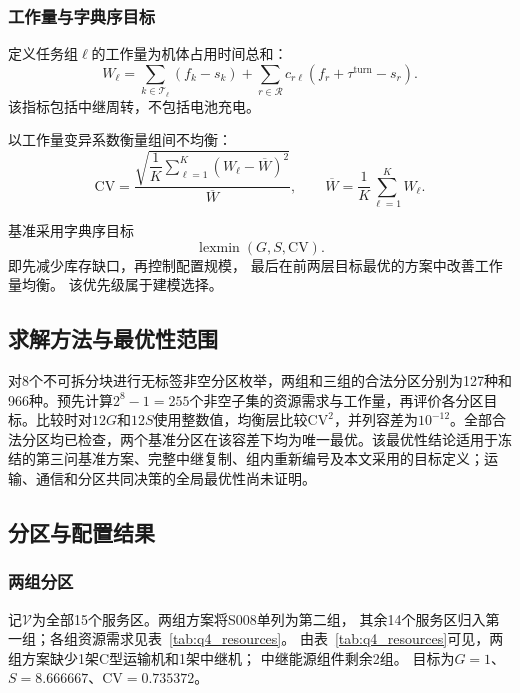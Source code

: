 \documentclass[bwprint]{gmcmthesis}
\begin{document}
\subsubsection{工作量与字典序目标}

定义任务组$\ell$的工作量为机体占用时间总和：
\begin{equation}
W_\ell
=
\sum_{k\in\mathcal{T}_\ell}(f_k-s_k)
+
\sum_{r\in\mathcal{R}}
c_{r\ell}(f_r+\tau^{\mathrm{turn}}-s_r).
\end{equation}
该指标包括中继周转，不包括电池充电。

以工作量变异系数衡量组间不均衡：
\begin{equation}
\mathrm{CV}
=
\frac{
\sqrt{\dfrac{1}{K}\sum_{\ell=1}^{K}(W_\ell-\overline{W})^2}
}{\overline{W}},
\qquad
\overline{W}=\frac{1}{K}\sum_{\ell=1}^{K}W_\ell.
\end{equation}

基准采用字典序目标
\begin{equation}
\operatorname{lexmin}(G,S,\mathrm{CV}).
\end{equation}
即先减少库存缺口，再控制配置规模，
最后在前两层目标最优的方案中改善工作量均衡。
该优先级属于建模选择。

\subsection{求解方法与最优性范围}
对8个不可拆分块进行无标签非空分区枚举，两组和三组的合法分区分别为127种和966种。预先计算$2^8-1=255$个非空子集的资源需求与工作量，再评价各分区目标。比较时对$12G$和$12S$使用整数值，均衡层比较$\mathrm{CV}^2$，并列容差为$10^{-12}$。全部合法分区均已检查，两个基准分区在该容差下均为唯一最优。该最优性结论适用于冻结的第三问基准方案、完整中继复制、组内重新编号及本文采用的目标定义；运输、通信和分区共同决策的全局最优性尚未证明。

\subsection{分区与配置结果}
\subsubsection{两组分区}
记$\mathcal V$为全部15个服务区。两组方案将S008单列为第二组，
其余14个服务区归入第一组；各组资源需求见表~\ref{tab:q4_resources}。
由表~\ref{tab:q4_resources}可见，两组方案缺少1架C型运输机和1架中继机；
中继能源组件剩余2组。
目标为$G=1$、$S=8.666667$、$\mathrm{CV}=0.735372$。
\end{document}
